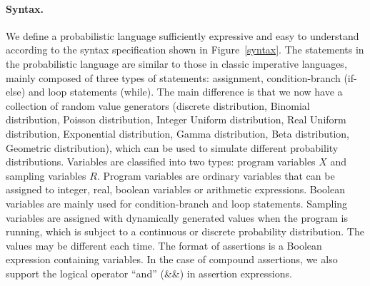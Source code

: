 \documentclass[runningheads]{llncs}
\begin{document}
\paragraph{Syntax.} We define a probabilistic language sufficiently expressive and easy to understand according to the syntax specification shown in Figure~\ref{syntax}. The statements in the probabilistic language are similar to those in classic imperative languages, mainly composed of three types of statements: assignment, condition-branch (if-else) and loop statements (while). The main difference is that we now have a collection of random value generators (discrete distribution, Binomial distribution, Poisson distribution, Integer Uniform distribution, Real Uniform distribution, Exponential distribution, Gamma distribution, Beta distribution, Geometric distribution), which can be used to simulate different probability distributions. Variables are classified into two types: program variables $X$ and sampling variables $R$. Program variables are ordinary variables that can be assigned to integer, real, boolean variables or arithmetic expressions. Boolean variables are mainly used for condition-branch and loop statements. Sampling variables are assigned with dynamically generated values when the program is running, which is subject to a continuous or discrete probability distribution. The values may be different each time. %
The format of assertions is a Boolean expression containing variables. %
In the case of compound assertions, we also support the logical operator ``and'' (\&\&) in assertion expressions.
\end{document}
